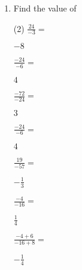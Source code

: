 \begin{enumerate} [leftmargin=0cm]
\item Find the value of
\begin{tasks}[label=(\alph*), after-item-skip=2pt,after-skip=3pt, label-width=4ex](2)
    \task  $ \frac{24}{-3}=              $                              \begin{envFillIn}$  -8                $    \end{envFillIn}
    \task  $ \frac{-24}{-6}=             $                              \begin{envFillIn}$  4                 $    \end{envFillIn}
    \task  $ \frac{-72}{-24}=            $                              \begin{envFillIn}$  3                 $    \end{envFillIn}
    \task  $ \frac{-24}{-6}=             $                              \begin{envFillIn}$  4                 $    \end{envFillIn}
    \task  $ \frac{19}{-57}=             $                              \begin{envFillIn}$  -\frac{1}{3}      $    \end{envFillIn}
    \task  $ \frac{-4}{-16}=             $                              \begin{envFillIn}$  \frac{1}{4}       $    \end{envFillIn}
    \task  $ \frac{-4+6}{-16+8}=         $                              \begin{envFillIn}$  -\frac{1}{4}      $    \end{envFillIn}
\end{tasks}


\end{enumerate}
